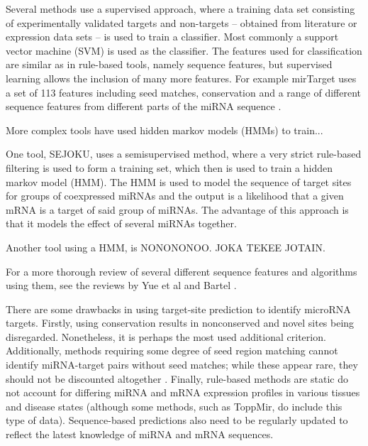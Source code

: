 Several methods use a supervised approach, where a training data set
consisting of experimentally validated targets and non-targets -- obtained
from literature or expression data sets -- is used to train
a classifier. Most commonly a support vector machine (SVM) is used
as the classifier. The features used for classification are
similar as in rule-based tools, namely sequence features, but
supervised learning allows the inclusion of many more features.
For example mirTarget uses a set of 113 features including seed matches,
conservation and a range of different sequence features from different
parts of the miRNA sequence \citep{mirTarget}.


More complex tools have used hidden markov models (HMMs) to 
train...

One tool, SEJOKU, uses a semisupervised method, where a very strict
rule-based filtering is used to form a training set, which then
is used to train a hidden markov model (HMM). The HMM is used
to model the sequence of target sites for groups of coexpressed miRNAs
and the output is a likelihood that a given mRNA is a target of said
group of miRNAs. The advantage of this approach is that it models
the effect of several miRNAs together.

Another tool using a HMM, is NONONONOO. JOKA TEKEE JOTAIN.


For a more thorough
review of several different sequence features and algorithms using them,
see the reviews by Yue et al \citep{Yeu2009} and Bartel \citep{Bartel2009}.

There are some drawbacks in using target-site prediction to identify microRNA
targets. Firstly, using conservation results in nonconserved and novel sites
being disregarded. Nonetheless, it is perhaps the most used additional
criterion. Additionally, methods requiring some degree of seed region matching
cannot identify miRNA-target pairs without seed matches; while these appear
rare, they should not be discounted altogether \citep{Bartel2009}. Finally,
rule-based methods are static do not account for differing miRNA
and mRNA expression profiles in various tissues and disease states (although
some methods, such as ToppMir, do include this type of data). Sequence-based
predictions also need to be regularly updated to reflect the latest knowledge
of miRNA and mRNA sequences.



